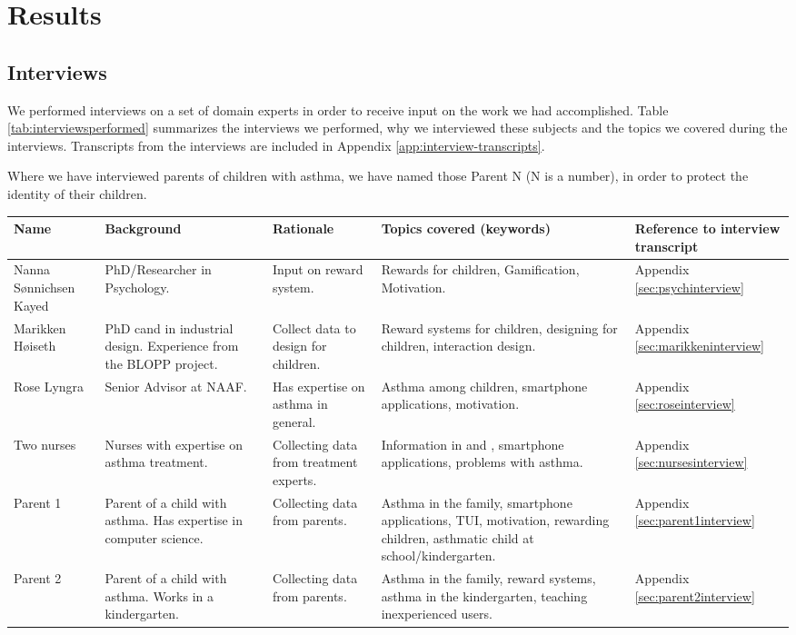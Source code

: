 \chapter{Results}
\label{chp:results}

\section{Interviews}
\label{sec:interviewresults}

We performed interviews on a set of domain experts in order to receive input on the work we had accomplished. Table \ref{tab:interviewsperformed} summarizes the interviews we performed, why we interviewed these subjects and the topics we covered during the interviews. Transcripts from the interviews are included in Appendix \ref{app:interview-transcripts}. 

Where we have interviewed parents of children with asthma, we have named those Parent N (N is a number), in order to protect the identity of their children.  

\begin{sidewaystable}
\centering
\begin{tabular}{| p{3.0cm} | p{4.0cm} | p{3.5cm} | p{6.0cm} | p{2.5cm} |}
	\hline
	\textbf{Name} & \textbf{Background} & \textbf{Rationale} & \textbf{Topics covered (keywords)} & \textbf{Reference to interview transcript} \\
	\hline
	Nanna S\o nnichsen Kayed & PhD/Researcher in Psychology. & Input on reward system. & Rewards for children, Gamification, Motivation. & Appendix \ref{sec:psychinterview} \\
	\hline
	Marikken H\o iseth & PhD cand in industrial design. Experience from the BLOPP project. & Collect data to design for children. & Reward systems for children, designing for children, interaction design. & Appendix \ref{sec:marikkeninterview} \\
	\hline
	Rose Lyngra & Senior Advisor at NAAF. & Has expertise on asthma in general. & Asthma among children, smartphone applications, motivation. & Appendix \ref{sec:roseinterview} \\
	\hline
	Two nurses & Nurses with expertise on asthma treatment. & Collecting data from treatment experts. & Information in \ab{} and \app{}, smartphone applications, problems with asthma. & Appendix \ref{sec:nursesinterview} \\
	\hline
	Parent 1 & Parent of a child with asthma. Has expertise in computer science. & Collecting data from parents. & Asthma in the family, smartphone applications, TUI, motivation, rewarding children, asthmatic child at school/kindergarten. & Appendix \ref{sec:parent1interview} \\
	\hline
	Parent 2 & Parent of a child with asthma. Works in a kindergarten. & Collecting data from parents. & Asthma in the family, reward systems, asthma in the kindergarten, teaching inexperienced users. & Appendix \ref{sec:parent2interview} \\
	\hline     
\end{tabular}
\caption{Interviews performed during the project}
\label{tab:interviewsperformed}
\end{sidewaystable}  

